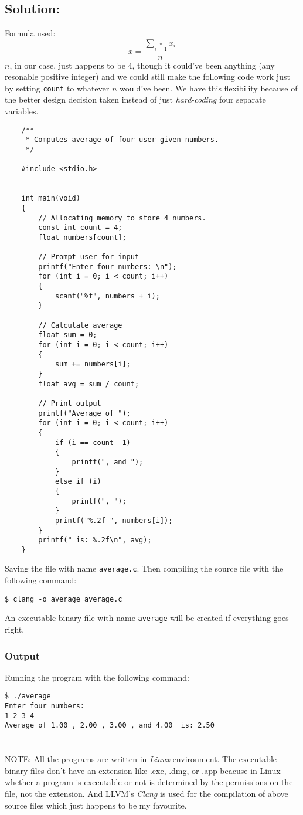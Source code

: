 \documentclass[12pt, letterpaper]{report}
\begin{document}
\subsection*{Solution:}
Formula used:
\begin{displaymath}
\bar{x} = \dfrac{\sum\limits_{i=1}\limits^n x_i}{n}
\end{displaymath}
$n$, in our case, just happens to be $4$, though it could've been anything (any resonable positive integer) and we could still make the following code work just by setting \texttt{count} to whatever $n$ would've been. We have this flexibility because of the better design decision taken instead of just \emph{hard-coding} four separate variables.
\begin{verbatim}
    /**
     * Computes average of four user given numbers.
     */ 

    #include <stdio.h>


    int main(void)
    {
        // Allocating memory to store 4 numbers.
        const int count = 4;
        float numbers[count];

        // Prompt user for input
        printf("Enter four numbers: \n");
        for (int i = 0; i < count; i++)
        {
            scanf("%f", numbers + i);
        }

        // Calculate average
        float sum = 0;
        for (int i = 0; i < count; i++)
        {
            sum += numbers[i];
        }
        float avg = sum / count;

        // Print output
        printf("Average of ");
        for (int i = 0; i < count; i++)
        {
            if (i == count -1)
            {
                printf(", and ");
            }
            else if (i)
            {
                printf(", ");
            }
            printf("%.2f ", numbers[i]);
        }
        printf(" is: %.2f\n", avg);
    }
\end{verbatim}
Saving the file with name \texttt{average.c}. Then compiling the source file with the following command:
\begin{verbatim}
$ clang -o average average.c
\end{verbatim}
An executable binary file with name \texttt{average} will be created if everything goes right.

\subsubsection*{Output}
Running the program with the following command:
\begin{verbatim}
$ ./average
Enter four numbers:
1 2 3 4
Average of 1.00 , 2.00 , 3.00 , and 4.00  is: 2.50
\end{verbatim}

\section*{}
NOTE: All the programs are written in \emph{Linux} environment. The executable binary files don't have an extension like .exe, .dmg, or .app beacuse in Linux whether a program is executable or not is determined by the permissions on the file, not the extension. And LLVM's \emph{Clang} is used for the compilation of above source files which just happens to be my favourite.
\end{document}
